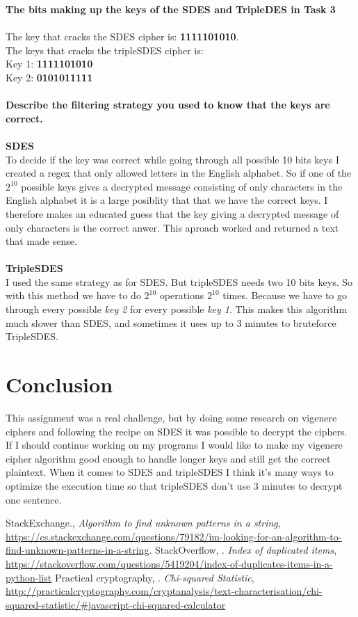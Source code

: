 \documentclass[12pt, letterpaper]{article}
\begin{document}
\textbf{The bits making up the keys of the SDES and TripleDES in Task 3}
\\ \\
The key that cracks the SDES cipher is: \textbf{1111101010}. \\
The keys that cracks the tripleSDES cipher is: \\ Key 1: \textbf{1111101010} \\ Key 2: \textbf{0101011111}
\\ \\
\textbf{Describe the filtering strategy you used to know that the keys are correct.}
\\ \\
\textbf{SDES} \\ 
To decide if the key was correct while going through all possible 10 bits keys I created a regex that only allowed letters in the English alphabet. So if one of the $2^{10}$ possible keys gives a decrypted message consisting of only characters in the English alphabet it is a large posiblity that that we have the correct keys. I therefore makes an educated guess that the key giving a decrypted message of only characters is the correct anwer. This aproach worked and returned a text that made sense.
\\ \\
\textbf{TripleSDES} \\
I used the same strategy as for SDES. But tripleSDES needs two 10 bits keys. So with this method we have to do $2^{10}$ operations $2^{10}$ times. Because we have to go through every possible \textit{key 2} for every possible \textit{key 1}. This makes this algorithm much slower than SDES, and sometimes it uses up to 3 minutes to bruteforce TripleSDES.


\section*{Conclusion}
This assignment was a real challenge, but by doing some research on vigenere ciphers and following the recipe on SDES it was possible to decrypt the ciphers. If I should continue working on my programs I would like to make my vigenere cipher algorithm good enough to handle longer keys and still get the correct plaintext. When it comes to SDES and tripleSDES I think it's many ways to optimize the execution time so that tripleSDES don't use 3 minutes to decrypt one sentence. 

\newpage
\begin{thebibliography}{10} 
 StackExchange., \emph{Algorithm to find unknown patterns in a string},
\url{https://cs.stackexchange.com/questions/79182/im-looking-for-an-algorithm-to-find-unknown-patterns-in-a-string}.
 StackOverflow, . \emph{Index of duplicated items},
\url{https://stackoverflow.com/questions/5419204/index-of-duplicates-items-in-a-python-list}
 Practical cryptography, . \emph{Chi-squared Statistic},
\url{http://practicalcryptography.com/cryptanalysis/text-characterisation/chi-squared-statistic/#javascript-chi-squared-calculator}
\end{thebibliography}
\end{document}
